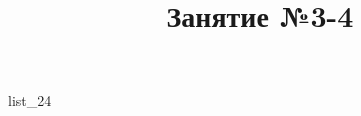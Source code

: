 \documentclass[12pt, a4paper]{article}
\begin{document}
	\title{Занятие №3-4}
	{list_24}
\end{document}
